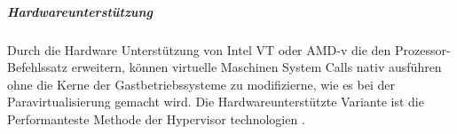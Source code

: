 \subparagraph{Hardwareunterstützung}
Durch die Hardware Unterstützung von Intel VT\cite{TechnologyIntel} oder AMD-v\cite{AMDVirtualisierungstechnologie} die den Prozessor-Befehlssatz erweitern, können virtuelle Maschinen System Calls nativ ausführen ohne die Kerne der Gastbetriebssysteme zu modifizierne, wie es bei der Paravirtualisierung gemacht wird. Die Hardwareunterstützte Variante ist die Performanteste Methode der Hypervisor technologien \cite{Meinel2011VirtualisierungMarktubersicht}.




